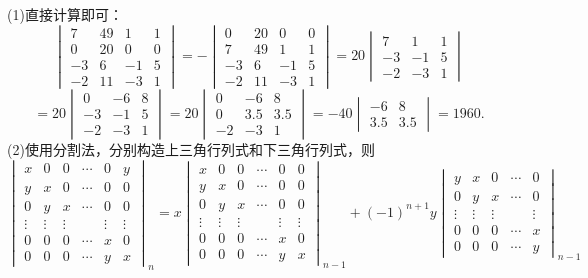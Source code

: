 \begin{solution}
    (1)直接计算即可：
    \[\begin{vmatrix}7&49&1&1\\0&20&0&0\\-3&6&-1&5\\-2&11&-3&1\end{vmatrix}
    =-\begin{vmatrix}0&20&0&0\\7&49&1&1\\-3&6&-1&5\\-2&11&-3&1\end{vmatrix}
    =20\begin{vmatrix}7&1&1\\-3&-1&5\\-2&-3&1\end{vmatrix}\]\[
    =20\begin{vmatrix}0&-6&8\\-3&-1&5\\-2&-3&1\end{vmatrix}
    =20\begin{vmatrix}0&-6&8\\0&3.5&3.5\\-2&-3&1\end{vmatrix}
    =-40\begin{vmatrix}-6&8\\3.5&3.5\end{vmatrix}=1960.
    \]
    (2)使用分割法，分别构造上三角行列式和下三角行列式，则\[
    \begin{vmatrix}x&0&0&\cdots&0&y\\y&x&0&\cdots&0&0\\0&y&x&\cdots&0&0\\\vdots&\vdots&\vdots&&\vdots&\vdots\\0&0&0&\cdots&x&0\\0&0&0&\cdots&y&x\end{vmatrix}_n
    =x\begin{vmatrix}x&0&0&\cdots&0&0\\y&x&0&\cdots&0&0\\0&y&x&\cdots&0&0\\\vdots&\vdots&\vdots&&\vdots&\vdots\\0&0&0&\cdots&x&0\\0&0&0&\cdots&y&x\end{vmatrix}_{n-1}+(-1)^{n+1}y\begin{vmatrix}y&x&0&\cdots&0\\0&y&x&\cdots&0\\\vdots&\vdots&\vdots&&\vdots\\0&0&0&\cdots&x\\0&0&0&\cdots&y\end{vmatrix}_{n-1}
\]
\end{solution}
